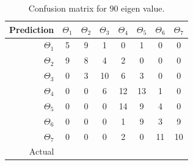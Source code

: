 \documentclass[runningheads,a4paper]{llncs}
\begin{document}
\begin{table}
\centering
\caption{Confusion matrix for $90$ eigen value.}
\label{tab:conf90}
\begin{tabular}{@{}r|ccccccc@{}}
\toprule
Prediction & \multicolumn{1}{r}{$\Theta_1$} & \multicolumn{1}{r}{$\Theta_2$} & \multicolumn{1}{r}{$\Theta_3$} & \multicolumn{1}{r}{$\Theta_4$} & \multicolumn{1}{r}{$\Theta_5$} & \multicolumn{1}{r}{$\Theta_6$} & \multicolumn{1}{r}{$\Theta_7$} \\ \midrule
$\Theta_1$ & 5                              & 9                              & 1                              & 0                              & 1                              & 0                              & 0                              \\
$\Theta_2$ & 9                              & 8                              & 4                              & 2                              & 0                              & 0                              & 0                              \\
$\Theta_3$ & 0                              & 3                              & 10                             & 6                              & 3                              & 0                              & 0                              \\
$\Theta_4$ & 0                              & 0                              & 6                              & 12                             & 13                             & 1                              & 0                              \\
$\Theta_5$ & 0                              & 0                              & 0                              & 14                             & 9                              & 4                              & 0                              \\
$\Theta_6$ & 0                              & 0                              & 0                              & 1                              & 9                              & 3                              & 9                              \\
$\Theta_7$ & 0                              & 0                              & 0                              & 2                              & 0                              & 11                             & 10                             \\ \midrule
Actual     & \multicolumn{1}{l}{}           & \multicolumn{1}{l}{}           & \multicolumn{1}{l}{}           & \multicolumn{1}{l}{}           & \multicolumn{1}{l}{}           & \multicolumn{1}{l}{}           & \multicolumn{1}{l}{}           \\ \cmidrule(r){1-1}
\end{tabular}
\end{table}
\end{document}
